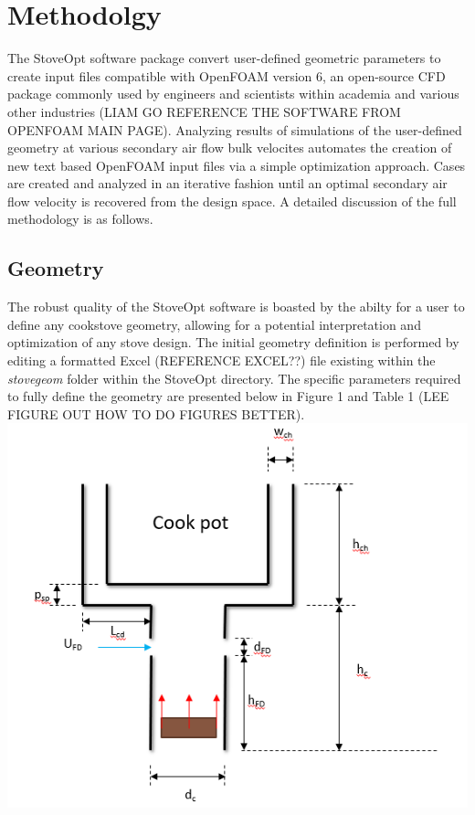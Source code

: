 \documentclass[3p,times,twocolumn]{elsarticle}
\begin{document}
\section{Methodolgy}
The StoveOpt software package convert user-defined geometric parameters to create input files compatible with OpenFOAM version 6, an open-source CFD package commonly used by engineers and scientists within academia and various other industries (LIAM GO REFERENCE THE SOFTWARE FROM OPENFOAM MAIN PAGE). Analyzing results of simulations of the user-defined geometry at various secondary air flow bulk velocites automates the creation of new text based OpenFOAM input files via a simple optimization approach. Cases are created and analyzed in an iterative fashion until an optimal secondary air flow velocity is recovered from the design space. A detailed discussion of the full methodology is as follows.   

\subsection{Geometry}
The robust quality of the StoveOpt software is boasted by the abilty for a user to define any cookstove geometry, allowing for a potential interpretation and optimization of any stove design. The initial geometry definition is performed by editing a formatted Excel (REFERENCE EXCEL??) file existing within the \textit{stovegeom} folder within the StoveOpt directory. The specific parameters required to fully define the geometry are presented below in Figure 1 and Table 1 (LEE FIGURE OUT HOW TO DO FIGURES BETTER).     
\includegraphics{geometryfrompres.PNG}
\end{document}
